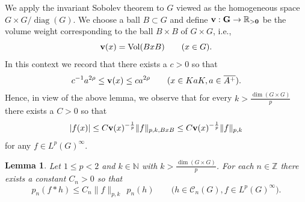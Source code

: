 \documentclass[12pt,letterpaper,titlepage,reqno]{amsart}
\theoremstyle{plain}
\newtheorem{lemma}[theorem]{Lemma}
\theoremstyle{definition}
\numberwithin{equation}{section}
\newcommand{\R}{\mathbb{R}}
\newcommand{\N}{\mathbb{N}}
\newcommand{\diag}{\operatorname{diag}}
\begin{document}
We apply the invariant Sobolev theorem to $G$ viewed as the homogeneous space $G\times G/ \diag(G)$. We choose a ball $B\subset G$ and define $\bf{v}:G\to \R_{>0}$ be the volume weight corresponding to the ball $B\times B$ of $G\times G$, i.e.,
$$
{\bf{v}}(x)
=\text{Vol}(BxB)\qquad (x\in G).
$$
In this context we record that there exists a $c>0$ so that
\begin{equation}
\label{ballest}
c^{-1}a^{2\rho}\leq {\bf{v}}(x) \leq ca^{2\rho} \qquad (x \in KaK, a\in \overline{A^+}).
\end{equation}
Hence, in view of the above lemma, we observe that for every $k>\frac{\dim (G\times G)}{p}$ there exists a $C>0$ so that
\begin{equation}
	\label{brlemmacon}
	|f(x)|\leq C {\bf{v}}(x)^{-\frac1p}\|f\|_{p,k, BxB}\leq C {\bf{v}}(x)^{-\frac1p}\|f\|_{p,k}
\end{equation}
for any $f\in L^p(G)^{\infty}$.

\begin{lemma}
Let $1\leq p<2$ and $k\in \N$ with $k>\frac{\dim (G\times G)}{p}$. For each $n\in \mathbb{Z}$ there exists a constant $C_{n}>0$ so that
$$
p_n(f\ast h)
\leq C_n\|f\|_{p,k}~~p_n(h)\qquad \big(h\in  \mathcal{C}_n(G), f\in L^p(G)^{\infty}\big).
$$
\end{lemma}
\end{document}
